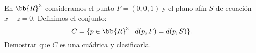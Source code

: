 \begin{ejercicio}
    En $\bb{R}^3$ consideramos el punto $F = (0, 0, 1)$ y el plano afín $S$ de ecuación $x-z = 0$. Definimos el conjunto:
    \begin{equation*}
        C = \{p \in \bb{R}^3 \mid d(p, F) = d(p, S)\}.
    \end{equation*}
    Demostrar que $C$ es una cuádrica y clasificarla.
\end{ejercicio}